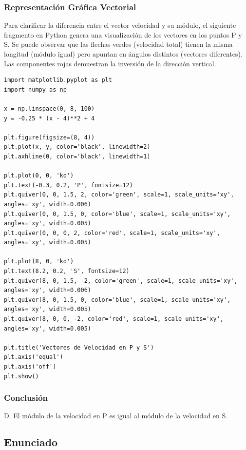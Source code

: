 \documentclass[12pt, a4paper]{article}
\begin{document}
\subsubsection*{Representación Gráfica Vectorial}

Para clarificar la diferencia entre el vector velocidad y su módulo, el siguiente fragmento en Python genera una visualización de los vectores en los puntos P y S. Se puede observar que las flechas verdes (velocidad total) tienen la misma longitud (módulo igual) pero apuntan en ángulos distintos (vectores diferentes). Las componentes rojas demuestran la inversión de la dirección vertical.

\begin{lstlisting}
import matplotlib.pyplot as plt
import numpy as np

x = np.linspace(0, 8, 100)
y = -0.25 * (x - 4)**2 + 4

plt.figure(figsize=(8, 4))
plt.plot(x, y, color='black', linewidth=2)
plt.axhline(0, color='black', linewidth=1)

plt.plot(0, 0, 'ko')
plt.text(-0.3, 0.2, 'P', fontsize=12)
plt.quiver(0, 0, 1.5, 2, color='green', scale=1, scale_units='xy', angles='xy', width=0.006)
plt.quiver(0, 0, 1.5, 0, color='blue', scale=1, scale_units='xy', angles='xy', width=0.005)
plt.quiver(0, 0, 0, 2, color='red', scale=1, scale_units='xy', angles='xy', width=0.005)

plt.plot(8, 0, 'ko')
plt.text(8.2, 0.2, 'S', fontsize=12)
plt.quiver(8, 0, 1.5, -2, color='green', scale=1, scale_units='xy', angles='xy', width=0.006)
plt.quiver(8, 0, 1.5, 0, color='blue', scale=1, scale_units='xy', angles='xy', width=0.005)
plt.quiver(8, 0, 0, -2, color='red', scale=1, scale_units='xy', angles='xy', width=0.005)

plt.title('Vectores de Velocidad en P y S')
plt.axis('equal')
plt.axis('off')
plt.show()
\end{lstlisting}

\subsubsection*{Conclusión}

D. El módulo de la velocidad en P es igual al módulo de la velocidad en S.

\newpage

\subsection*{Enunciado}
\end{document}
